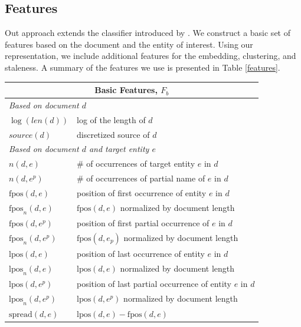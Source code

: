 \documentclass{article}
\begin{document}
\subsection{Features}
\label{feat}

Out approach extends the classifier introduced by \citet{jingang13}.
We construct a basic set of features based on the document and the entity of interest.
Using our representation, we include additional features for the embedding, clustering, and staleness.
A summary of the features we use is presented in Table \ref{features}. 


\begin{table}[tb]
\center
{\small
\begin{tabular}{p{}p{}}
\toprule
\multicolumn{2}{c}{\textbf{Basic Features, $F_b$}} \\ %
\midrule
\multicolumn{2}{l}{\emph{Based on document $d$}} \\ %
$\log(len(d))$ & log of the length of $d$ \\ %
$source(d)$ & discretized source of $d$ \\
\multicolumn{2}{l}{\emph{Based on document $d$ and target entity $e$}} \\ %
$n(d,e)$ & \# of occurrences of target entity $e$ in $d$ \\
$n(d,e^p)$ & \# of occurrences of partial name of $e$ in $d$ \\
$\text{fpos}(d,e)$ & position of first occurrence of entity $e$ in $d$ \\
$\text{fpos}_n(d,e)$ & $\text{fpos}(d,e)$ normalized by document length \\
$\text{fpos}(d,e^p)$ & position of first partial occurrence of $e$ in $d$ \\
$\text{fpos}_n(d,e^p)$ & $\text{fpos}(d,e_p)$ normalized by document length \\
$\text{lpos}(d,e)$ & position of last occurrence of entity $e$ in $d$ \\
$\text{lpos}_n(d,e)$ & $\text{lpos}(d,e)$ normalized by document length \\
$\text{lpos}(d,e^p)$ & position of last partial occurrence of entity $e$ in $d$ \\
$\text{lpos}_n(d,e^p)$ & $\text{lpos}(d,e^p)$ normalized by document length \\ 
$\text{spread}(d,e)$ & $\text{lpos}(d,e) - \text{fpos}(d,e)$ \\

\end{tabular}}
\end{table}
\end{document}
